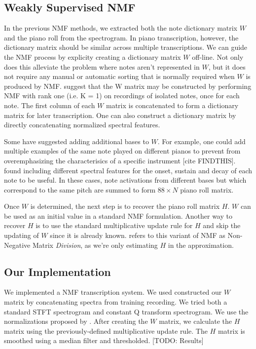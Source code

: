 \documentclass[5p]{elsarticle}
\begin{document}

\subsection{Weakly Supervised NMF}

In the previous NMF methods, we extracted both the note dictionary matrix $W$ and the piano roll from the spectrogram. In piano transcription, however, the dictionary matrix should be similar across multiple transcriptions. We can guide the NMF process by explicity creating a dictionary matrix $W$ off-line. Not only does this alleviate the problem where notes aren't represented in $W$, but it does not require any manual or automatic sorting that is normally required when $W$ is produced by NMF. \citet{weninger2013discriminative} suggest that the W matrix may be constructed by performing NMF with rank one (i.e. K = 1) on recordings of isolated notes, once for each note. The first column of each $W$ matrix is concatenated to form a dictionary matrix for later transcription. One can also construct a dictionary matrix by directly concatenating normalized spectral features\cite{niedermayer2008non}.

Some have suggested adding additional bases to $W$. For example, one could add multiple examples of the same note played on different pianos to prevent from overemphasizing the characterisics of a specific instrument [cite FINDTHIS]. \citet{weninger2013discriminative} found including different spectral features for the onset, sustain and decay of each note to be useful. In these cases, note activations from different bases but which correspond to the same pitch are summed to form $88 \times N$ piano roll matrix.

Once $W$ is determined, the next step is to recover the piano roll matrix $H$. $W$ can be used as an initial value in a standard NMF formulation. Another way to recover $H$ is to use the standard multiplicative update rule for $H$ and skip the updating of $W$ since it is already known. \citet{niedermayer2008non} refers to this variant of NMF as Non-Negative Matrix \textit{Division}, as we're only estimating $H$ in the approximation.

\subsection{Our Implementation}

We implemented a NMF transcription system. We used constructed our $W$ matrix by concatenating spectra from training recording. We tried both a standard STFT spectrogram and constant Q transform spectrogram. We use the normalizations proposed by \citet{niedermayer2008non}. After creating the $W$ matrix, we calculate the $H$ matrix using the previously-defined multiplicative update rule. The $H$ matrix is smoothed using a median filter and thresholded. [TODO: Results]
\end{document}
